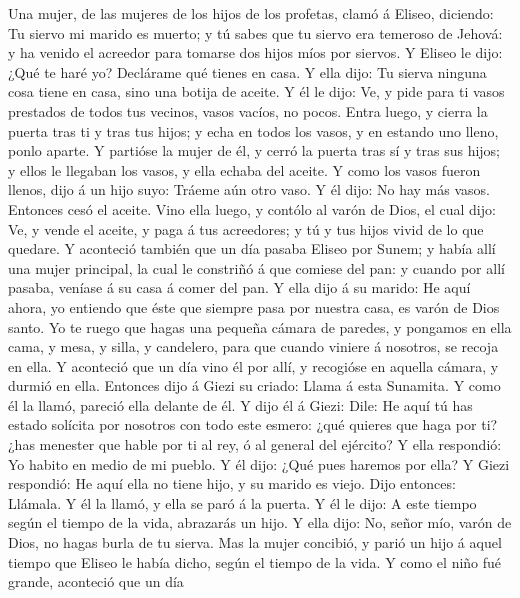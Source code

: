  Una mujer, de las mujeres de los hijos de los profetas,
clamó á Eliseo, diciendo: Tu siervo mi marido es muerto; y tú sabes que
tu siervo era temeroso de Jehová: y ha venido el acreedor para tomarse
dos hijos míos por siervos.  Y Eliseo le dijo: ¿Qué te haré
yo? Declárame qué tienes en casa. Y ella dijo: Tu sierva ninguna cosa
tiene en casa, sino una botija de aceite.  Y él le dijo: Ve,
y pide para ti vasos prestados de todos tus vecinos, vasos vacíos, no
pocos.  Entra luego, y cierra la puerta tras ti y tras tus
hijos; y echa en todos los vasos, y en estando uno lleno, ponlo aparte.
 Y partióse la mujer de él, y cerró la puerta tras sí y tras
sus hijos; y ellos le llegaban los vasos, y ella echaba del aceite.
 Y como los vasos fueron llenos, dijo á un hijo suyo: Tráeme
aún otro vaso. Y él dijo: No hay más vasos. Entonces cesó el aceite.
 Vino ella luego, y contólo al varón de Dios, el cual dijo:
Ve, y vende el aceite, y paga á tus acreedores; y tú y tus hijos vivid
de lo que quedare.  Y aconteció también que un día pasaba
Eliseo por Sunem; y había allí una mujer principal, la cual le constriñó
á que comiese del pan: y cuando por allí pasaba, veníase á su casa á
comer del pan.  Y ella dijo á su marido: He aquí ahora, yo
entiendo que éste que siempre pasa por nuestra casa, es varón de Dios
santo.  Yo te ruego que hagas una pequeña cámara de
paredes, y pongamos en ella cama, y mesa, y silla, y candelero, para que
cuando viniere á nosotros, se recoja en ella.  Y aconteció
que un día vino él por allí, y recogióse en aquella cámara, y durmió en
ella.  Entonces dijo á Giezi su criado: Llama á esta
Sunamita. Y como él la llamó, pareció ella delante de él. 
Y dijo él á Giezi: Dile: He aquí tú has estado solícita por nosotros con
todo este esmero: ¿qué quieres que haga por ti? ¿has menester que hable
por ti al rey, ó al general del ejército? Y ella respondió: Yo habito en
medio de mi pueblo.  Y él dijo: ¿Qué pues haremos por ella?
Y Giezi respondió: He aquí ella no tiene hijo, y su marido es viejo.
 Dijo entonces: Llámala. Y él la llamó, y ella se paró á la
puerta.  Y él le dijo: A este tiempo según el tiempo de la
vida, abrazarás un hijo. Y ella dijo: No, señor mío, varón de Dios, no
hagas burla de tu sierva.  Mas la mujer concibió, y parió
un hijo á aquel tiempo que Eliseo le había dicho, según el tiempo de la
vida.  Y como el niño fué grande, aconteció que un día
